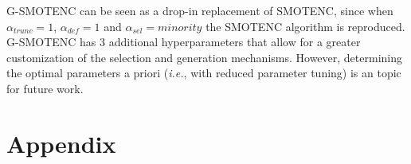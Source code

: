 \documentclass[parskip=full]{scrartcl}
\begin{document}
G-SMOTENC can be seen as a drop-in replacement of SMOTENC, since when
$\alpha_{trunc}=1$, $\alpha_{def}=1$ and $\alpha_{sel}=minority$ the SMOTENC
algorithm is reproduced. G-SMOTENC has 3 additional hyperparameters that allow
for a greater customization of the selection and generation mechanisms.
However, determining the optimal parameters a priori (\textit{i.e.}, with
reduced parameter tuning) is an topic for future work.




\appendix

\section{Appendix}


\end{document}
